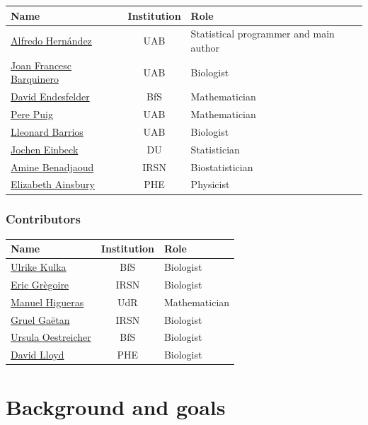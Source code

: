\documentclass[]{scrartcl}
\begin{document}
\begin{longtable}[]{@{}lcl@{}}
\toprule
Name & Institution & Role\tabularnewline
\midrule
\endhead
\href{http://aldomann.com}{Alfredo Hernández} & UAB & Statistical programmer and main author\tabularnewline
\href{https://scholar.google.com/citations?user=jMLzrEQAAAAJ}{Joan Francesc Barquinero} & UAB & Biologist\tabularnewline
\href{https://www.researchgate.net/profile/David_Endesfelder2}{David Endesfelder} & BfS & Mathematician\tabularnewline
\href{http://grupsderecerca.uab.cat/advancedstochasticmodelling/content/pere-puig}{Pere Puig} & UAB & Mathematician\tabularnewline
\href{https://www.researchgate.net/scientific-contributions/2058388356_Lleonard_Barrios}{Lleonard Barrios} & UAB & Biologist\tabularnewline
\href{https://www.dur.ac.uk/research/directory/staff/?id=4542}{Jochen Einbeck} & DU & Statistician\tabularnewline
\href{https://www.researchgate.net/profile/Mohamed_Benadjaoud}{Amine Benadjaoud} & IRSN & Biostatistician\tabularnewline
\href{https://www.phe-protectionservices.org.uk/cds/team/liz_ainsbury}{Elizabeth Ainsbury} & PHE & Physicist\tabularnewline
\bottomrule
\end{longtable}

\hypertarget{contributors}{%
\subsubsection*{Contributors}\label{contributors}}

\begin{longtable}[]{@{}lcl@{}}
\toprule
Name & Institution & Role\tabularnewline
\midrule
\endhead
\href{https://www.researchgate.net/profile/Ulrike_Kulka}{Ulrike Kulka} & BfS & Biologist\tabularnewline
\href{https://www.researchgate.net/profile/Eric_Gregoire2}{Eric Grègoire} & IRSN & Biologist\tabularnewline
\href{https://investigacion.unirioja.es/investigadores/1322/detalle}{Manuel Higueras} & UdR & Mathematician\tabularnewline
\href{https://www.researchgate.net/profile/Gruel_Gaetan}{Gruel Gaëtan} & IRSN & Biologist\tabularnewline
\href{https://www.researchgate.net/scientific-contributions/2121336457_Ursula_Oestreicher}{Ursula Oestreicher} & BfS & Biologist\tabularnewline
\href{https://www.phe-protectionservices.org.uk/cds/team/david_lloyd}{David Lloyd} & PHE & Biologist\tabularnewline
\bottomrule
\end{longtable}

\hypertarget{background-and-goals}{%
\section*{Background and goals}\label{background-and-goals}}
\end{document}
